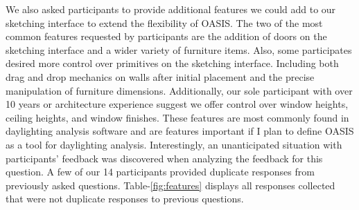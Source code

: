 We also asked participants to provide additional features we could add to our sketching interface to extend the flexibility of OASIS.
The two of the most common features requested by participants are the addition of doors on the sketching interface and a wider variety of furniture items.
Also, some participates desired more control over primitives on the sketching interface. 
Including both drag and drop mechanics on walls after initial placement and the precise manipulation of furniture dimensions.
Additionally, our sole participant with over 10 years or architecture experience suggest we offer control over window heights, ceiling heights, and window finishes.
These features are most commonly found in daylighting analysis software and are features important if I plan to define OASIS as a tool for daylighting analysis.
Interestingly, an unanticipated situation with participants' feedback was discovered when analyzing the feedback for this question.
A few of our 14 participants provided duplicate responses from previously asked questions.
Table-\ref{fig:features} displays  all responses collected that were not duplicate responses to previous questions. \\
 

